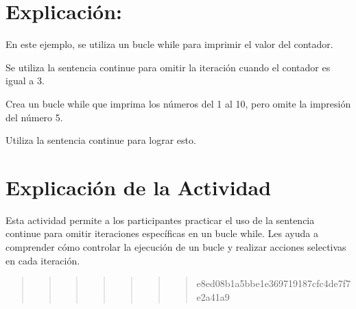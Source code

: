 \documentclass[
  a4paper,
  DIV=11,
  numbers=noendperiod,
  onepage,
  openany]{scrreprt}
\begin{document}
\hypertarget{explicaciuxf3n-41}{%
\section{Explicación:}\label{explicaciuxf3n-41}}

En este ejemplo, se utiliza un bucle while para imprimir el valor del
contador.

Se utiliza la sentencia continue para omitir la iteración cuando el
contador es igual a 3.

\begin{tcolorbox}[enhanced jigsaw, colbacktitle=quarto-callout-important-color!10!white, toprule=.15mm, leftrule=.75mm, titlerule=0mm, opacityback=0, rightrule=.15mm, opacitybacktitle=0.6, breakable, left=2mm, coltitle=black, title=\textcolor{quarto-callout-important-color}{\faExclamation}\hspace{0.5em}{Actividad Práctica:}, toptitle=1mm, bottomtitle=1mm, arc=.35mm, bottomrule=.15mm, colback=white, colframe=quarto-callout-important-color-frame]

Crea un bucle while que imprima los números del 1 al 10, pero omite la
impresión del número 5.

Utiliza la sentencia continue para lograr esto.

\end{tcolorbox}

\hypertarget{explicaciuxf3n-de-la-actividad-39}{%
\section{Explicación de la
Actividad}\label{explicaciuxf3n-de-la-actividad-39}}

Esta actividad permite a los participantes practicar el uso de la
sentencia continue para omitir iteraciones específicas en un bucle
while. Les ayuda a comprender cómo controlar la ejecución de un bucle y
realizar acciones selectivas en cada iteración.

\begin{quote}
\begin{quote}
\begin{quote}
\begin{quote}
\begin{quote}
\begin{quote}
\begin{quote}
e8ed08b1a5bbe1e369719187cfc4de7f7e2a41a9
\end{quote}
\end{quote}
\end{quote}
\end{quote}
\end{quote}
\end{quote}
\end{quote}
\end{document}
